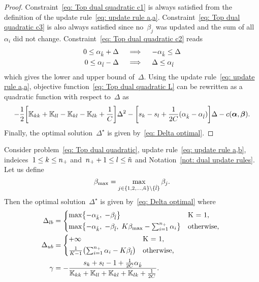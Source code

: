 \begin{proof}
  Constraint~\eqref{eq: Top dual quadratic c1} is always satisfied from the definition of the update rule~\eqref{eq: update rule a,a}. Constraint~\eqref{eq: Top dual quadratic c3} is also always satisfied since no~$\beta_j$ was updated and the sum of all~$\alpha_i$ did not change. Constraint~\eqref{eq: Top dual quadratic c2} reads
  \begin{align*}
    0 \leq \alpha_{\hat{k}} + \Delta
    & \quad \implies \quad
    - \alpha_{\hat{k}} \leq \Delta \\
    0 \leq \alpha_{\hat{l}} - \Delta
    & \quad \implies \quad
    \Delta \leq \alpha_{\hat{l}}
  \end{align*}
  which gives the lower and upper bound of~$\Delta.$ Using the update rule~\eqref{eq: update rule a,a}, objective function~\eqref{eq: Top dual quadratic L} can be rewritten as a quadratic function with respect to~$\Delta$ as
  \begin{equation*}
    - \frac{1}{2} \Brac[s]{\K_{kk} + \K_{ll} - \K_{kl} - \K_{lk} + \frac{1}{C}} \Delta^2
    - \Brac[s]{s_k - s_l + \frac{1}{2C}(\alphak - \alphal)} \Delta
    - c(\bm{\alpha}, \bm{\beta}).
  \end{equation*}
  Finally, the optimal solution~$\Delta^{\star}$ is given by~\eqref{eq: Delta optimal}.
\end{proof}

\begin{lemma}\label{thm: toppushk family quadratic update a,b}
  Consider problem~\eqref{eq: Top dual quadratic}, update rule~\eqref{eq: update rule a,b}, indeices~$1 \leq k \leq n_{+}$ and~$n_{+} + 1 \leq l \leq \tilde{n}$  and Notation~\ref{not: dual update rules}. Let us define
  \begin{equation*}
    \beta_{\max} = \max_{j \in \{1, 2, \ldots, \tilde{n} \} \setminus \{\hat{l}\}} \beta_j.
  \end{equation*}
  Then the optimal solution~$\Delta^{\star}$ is given by~\eqref{eq: Delta optimal} where
  \begin{align*}
    \Delta_{lb} & = 
      \begin{cases*}
        \max \Brac[c]{- \alphak,\;  -\betal} & K = 1, \\
        \max \Brac[c]{- \alphak,\;  -\betal, \; K\beta_{\max} - \sum_{i = 1}^{\npos} \alpha_i} & \textrm{otherwise},
      \end{cases*} \\
    \Delta_{ub} & = 
      \begin{cases*}
        + \infty & K = 1, \\
        \frac{1}{K-1}\Brac{\sum_{i = 1}^{\npos} \alpha_i - K \betal} & \textrm{otherwise},
      \end{cases*} \\
    \gamma & = -\frac{s_k + s_l - 1 + \frac{1}{2C} \alphak}{\K_{kk} + \K_{ll} + \K_{kl} + \K_{lk} + \frac{1}{2C}}.
  \end{align*}
\end{lemma}

